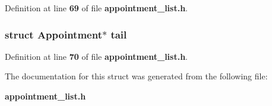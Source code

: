 Definition at line {\bf 69} of file {\bf appointment\+\_\+list.\+h}.

\subsubsection[{tail}]{\setlength{\rightskip}{0pt plus 5cm}struct {\bf Appointment}$\ast$ tail}\label{struct_appointment_list_a01edfd8148278caeea56bc48bcac6930}


Definition at line {\bf 70} of file {\bf appointment\+\_\+list.\+h}.



The documentation for this struct was generated from the following file\+:\begin{DoxyCompactItemize}
\item 
{\bf appointment\+\_\+list.\+h}\end{DoxyCompactItemize}
